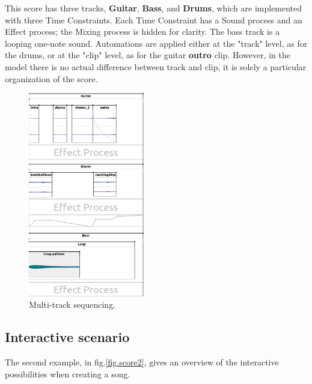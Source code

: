 \documentclass{article}
\begin{document}
This score has three tracks, \textbf{Guitar}, \textbf{Bass}, and \textbf{Drums}, which are implemented with three Time Constraints.
Each Time Constraint has a Sound process and an Effect process; the Mixing process is hidden for clarity.
The bass track is a looping one-note sound. Automations are applied either at the "track" level, as for the drums, or at the "clip" level, as for the guitar \textbf{outro} clip. 
However, in the model there is no actual difference between track and clip, it is solely a particular organization of the score.
 
\begin{figure}[h]
    \centering
    \includegraphics[width=0.45\textwidth]{figures/ex1.png}
    \caption{Multi-track sequencing.}
    \label{fig.score1}
\end{figure}

\subsection{Interactive scenario}
The second example, in fig.\ref{fig.score2}, gives an overview of the interactive possibilities when creating a song.
\end{document}
